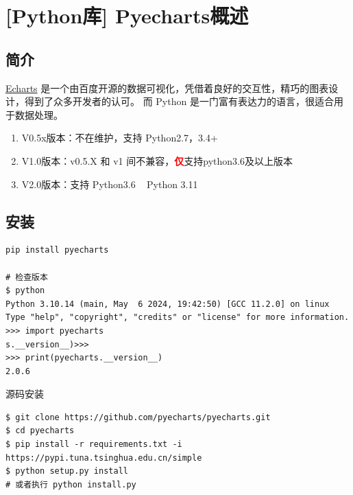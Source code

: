 \chapter{[Python库] Pyecharts概述}
\label{cha:pyecharts_intro}
\section{简介}
\label{sec:pyecharts_intro}
\href{https://pyecharts.org/#/zh-cn/}{Echarts} 是一个由百度开源的数据可视化，凭借着良好的交互性，精巧的图表设计，得到了众多开发者的认可。
而 Python 是一门富有表达力的语言，很适合用于数据处理。

\begin{enumerate}[itemindent=1em,label=\arabic*)]
    \item V0.5x版本：不在维护，支持 Python2.7，3.4+
    \item V1.0版本：v0.5.X 和 v1 间不兼容，\textcolor{red}{\textbf{仅}}支持python3.6及以上版本
    \item V2.0版本：支持 Python3.6 ~ Python 3.11
\end{enumerate}

\section{安装}
\label{sec:pyecharts_install}
\begin{lstlisting}[style=demostyle,numbers=none]
pip install pyecharts

# 检查版本
$ python
Python 3.10.14 (main, May  6 2024, 19:42:50) [GCC 11.2.0] on linux
Type "help", "copyright", "credits" or "license" for more information.
>>> import pyecharts
s.__version__)>>>
>>> print(pyecharts.__version__)
2.0.6
\end{lstlisting}

源码安装
\begin{lstlisting}[style=demostyle,numbers=none]
$ git clone https://github.com/pyecharts/pyecharts.git
$ cd pyecharts
$ pip install -r requirements.txt -i https://pypi.tuna.tsinghua.edu.cn/simple
$ python setup.py install
# 或者执行 python install.py
\end{lstlisting}



